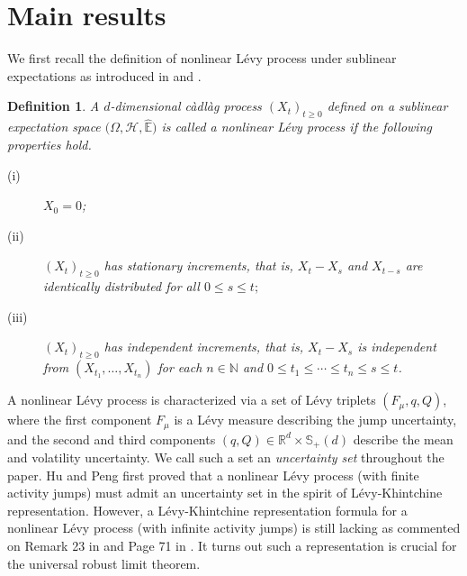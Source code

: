 \documentclass[a4paper,oneside,10pt]{article}%
\newtheorem{definition}[theorem]{Definition}
\numberwithin{equation}{section}
\begin{document}
\section{Main results}

We first recall the definition of nonlinear L\'{e}vy process under sublinear
expectations as introduced in \cite{HP2021} and \cite{NN2017}.

\begin{definition}
A $d$-dimensional c\`{a}dl\`{a}g process $(X_{t})_{t\geq0}$ defined on a
sublinear expectation space $(\Omega,\mathcal{H},\mathbb{\hat{E})}$ is called
a nonlinear L\'evy process if the following properties hold.

\begin{description}
\item[(i)] $X_{0}=0$;

\item[(ii)] $(X_{t})_{t\geq0}$ has stationary increments, that is,
$X_{t}-X_{s}$ and $X_{t-s}$ are identically distributed for all $0\leq s\leq
t;$

\item[(iii)] $(X_{t})_{t\geq0}$ has independent increments, that is,
$X_{t}-X_{s}$ is independent from $(X_{t_{1}},\ldots,X_{t_{n}})$ for each
$n\in \mathbb{N}$ and $0\leq t_{1}\leq \cdots \leq t_{n}\leq s\leq t$.
\end{description}
\end{definition}

A nonlinear L\'{e}vy process is characterized via a set of L\'{e}vy triplets
$(F_{\mu},q,Q)$, where the first component $F_{\mu}$ is a L\'{e}vy measure
describing the jump uncertainty, and the second and third components
$(q,Q)\in \mathbb{R}^{d}\times \mathbb{S}_{+}(d)$ describe the mean and
volatility uncertainty. We call such a set an \emph{uncertainty set}
throughout the paper. Hu and Peng \cite{HP2009,HP2021} first proved that a
nonlinear L\'{e}vy process (with finite activity jumps) must admit an
uncertainty set in the spirit of L\'{e}vy-Khintchine representation. However,
a L\'{e}vy-Khintchine representation formula for a nonlinear L\'{e}vy process
(with infinite activity jumps) is still lacking as commented on Remark 23 in
\cite{HP2021} and Page 71 in \cite{NN2017}. It turns out such a representation
is crucial for the universal robust limit theorem.
\end{document}
